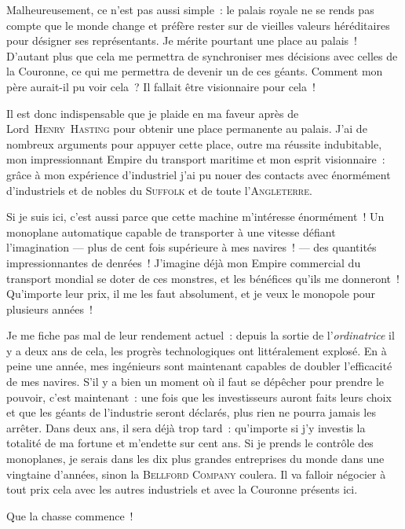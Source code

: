 {Malheureusement, ce n’est pas aussi simple~:  le palais royale ne se rends pas compte que le monde change et préfère rester sur de vieilles valeurs héréditaires pour désigner ses représentants.
Je mérite pourtant une place au palais~!  D’autant plus que cela me permettra de synchroniser mes décisions avec celles de la Couronne, ce qui me permettra de devenir un de ces géants.
Comment mon père aurait-il pu voir cela~?  Il fallait être visionnaire pour cela~!

Il est donc indispensable que je plaide en ma faveur après de Lord~\textsc{Henry~Hasting} pour obtenir une place permanente au palais.
J’ai de nombreux arguments pour appuyer cette place, outre ma réussite indubitable, mon impressionnant Empire du transport maritime et mon esprit visionnaire~:  grâce à mon expérience d’industriel j’ai pu nouer des contacts avec énormément d’industriels et de nobles du \textsc{Suffolk} et de toute l’\textsc{Angleterre}.

Si je suis ici, c’est aussi parce que cette machine m’intéresse énormément~!
Un monoplane automatique capable de transporter à une vitesse défiant l’imagination — plus de cent fois supérieure à mes navires~! — des quantités impressionnantes de denrées~!
J’imagine déjà mon Empire commercial du transport mondial se doter de ces monstres, et les bénéfices qu’ils me donneront~!
Qu’importe leur prix, il me les faut absolument, et je veux le monopole pour plusieurs années~!

Je me fiche pas mal de leur rendement actuel~:  depuis la sortie de l’\emph{ordinatrice} il y a deux ans de cela, les progrès technologiques ont littéralement explosé.
En à peine une année, mes ingénieurs sont maintenant capables de doubler l’efficacité de mes navires.
S’il y a bien un moment où il faut se dépêcher pour prendre le pouvoir, c’est maintenant~:  une fois que les investisseurs auront faits leurs choix et que les géants de l’industrie seront déclarés, plus rien ne pourra jamais les arrêter.
Dans deux ans, il sera déjà trop tard~:  qu’importe si j’y investis la totalité de ma fortune et m’endette sur cent ans.
Si je prends le contrôle des monoplanes, je serais dans les dix plus grandes entreprises du monde dans une vingtaine d’années, sinon la \textsc{Bellford Company} coulera.
Il va falloir négocier à tout prix cela avec les autres industriels et avec la Couronne présents ici.

Que la chasse commence~!
}

